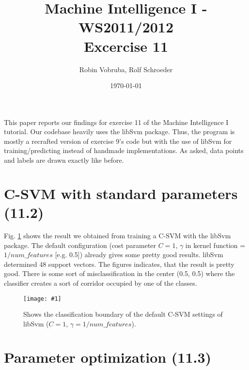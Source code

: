 \documentclass[a4paper,headings=small]{scrartcl}
\title{Machine Intelligence I - WS2011/2012\\Excercise 11}
\author{Robin Vobruba, Rolf Schroeder} %
\date{\today}
\newcommand{\image}[3]{
	\begin{figure}[htbp]
		\centering
		\texttt{[image: \#1]}
		\caption{#3}
		\label{fig:#1}
	\end{figure}
}
\begin{document}
\maketitle

This paper reports our findings for exercise 11 of the Machine Intelligence I tutorial. Our codebase heavily uses the libSvm package. Thus, the program is mostly a recrafted version of exercise 9's code but with the use of libSvm for training/predicting instead of handmade implementations. As asked, data points and labels are drawn exactly like before.

\section{C-SVM with standard parameters (11.2)}

Fig. \ref{fig:out_classifierSvm_cSvmDefault} shows the result we obtained from training a C-SVM with the libSvm package. The default configuration (cost parameter $C = 1$, $\gamma$ in kernel function = $1/num\_features$ [e.g. 0.5]) already gives some pretty good results. libSvm determined 48 support vectors. The figures indicates, that the result is pretty good. There is some sort of misclassification in the center (0.5, 0.5) where the classifier creates a sort of corridor occupied by one of the classes.

\image{out_classifierSvm_cSvmDefault}{0.9}%
	{Shows the classification boundary of the default C-SVM settings of libSvm ($C = 1$, $\gamma = 1/num\_features$).}


\section{Parameter optimization (11.3)}
\end{document}
